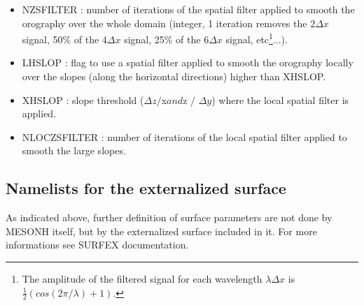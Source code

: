 \begin{itemize}
\item NZSFILTER : number of iterations of the spatial filter applied to smooth the orography over the whole domain (integer, 1 iteration removes the $2\Delta x$ signal, 50\% of the $4\Delta x$
signal, 25\% of the $6\Delta x$ signal, etc\footnote{The amplitude of the
filtered signal for each wavelength $\lambda\Delta x$ 
is $\frac{1}{2}\left( cos(2\pi/\lambda) +1\right)$.}...).
\item LHSLOP : flag to use a spatial filter applied to smooth the orography locally over the slopes (along the horizontal directions) higher than XHSLOP.
\item XHSLOP : slope threshold ($\Delta z / $\Delta x$ and $\Delta z / $\Delta y$) where the local spatial filter is applied.
\item NLOCZSFILTER : number of iterations of the local spatial filter applied to smooth the large slopes.

\end{itemize}
\subsection{Namelists for the externalized surface}

As indicated above, further definition of surface parameters are not done by MESONH itself, but by the externalized surface included in it. For more informations see SURFEX documentation.\\

